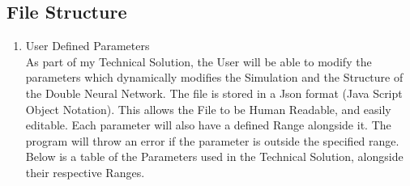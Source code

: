\begin{flushleft}
        \subsection{File Structure}
            \large
            \vspace{0.2cm}
            \begin{enumerate}
                \item {\Large User Defined Parameters} \\
                As part of my Technical Solution, the User will be able to modify the parameters which dynamically modifies the Simulation
                and the Structure of the Double Neural Network. The file is stored in a Json format (Java Script Object Notation).
                This allows the File to be Human Readable, and easily editable. Each parameter will also have a defined Range alongside it.
                The program will throw an error if the parameter is outside the specified range. Below is a table of the Parameters used in
                the Technical Solution, alongside their respective Ranges. \\

                \vspace{0.5cm}


\end{enumerate}
\end{flushleft}
